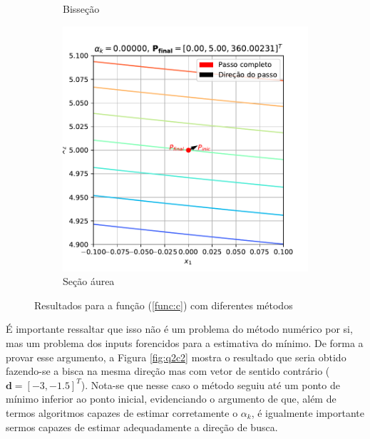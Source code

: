 \documentclass[10pt, a4paper]{article}
\begin{document}
\begin{figure}
\begin{subfigure}[b]{0.32\textwidth}
      \caption{Bisseção}
      \label{fig:q2c_2}
  \end{subfigure}
  \hfill
  \begin{subfigure}[b]{0.32\textwidth}
      \centering
      \includegraphics[width=\textwidth]{images/q2c_3.pdf}
      \caption{Seção áurea}
      \label{fig:q2c_3}
  \end{subfigure}
     \caption{Resultados para a função (\ref{func:c}) com diferentes métodos}
     \label{fig:q2c}
\end{figure}

É importante ressaltar que isso não é um problema do método numérico por si, mas um problema dos inputs forencidos para
a estimativa do mínimo. De forma a provar esse argumento, a Figura \ref{fig:q2c2} mostra o resultado que seria obtido 
fazendo-se a bisca na mesma direção mas com vetor de sentido contrário ($\mathbf{d} = [-3, -1.5]^T$). Nota-se que nesse caso o 
método seguiu até um ponto de mínimo inferior ao ponto inicial, evidenciando o argumento de que, além de termos algoritmos capazes de 
estimar corretamente o $\alpha_k$, é igualmente importante sermos capazes de estimar adequadamente a direção de busca.
\end{document}
